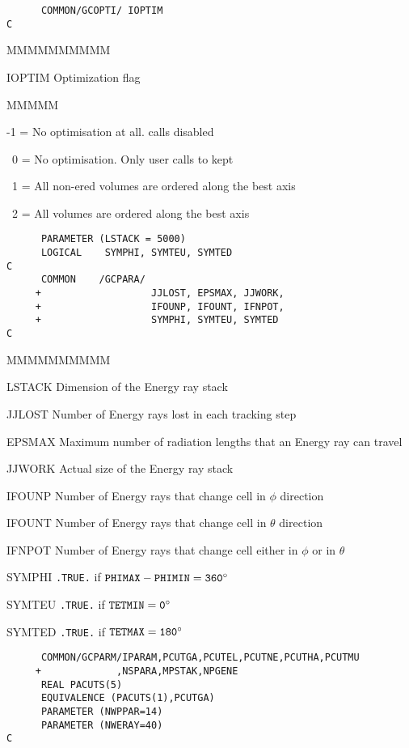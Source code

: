 \begin{verbatim}
      COMMON/GCOPTI/ IOPTIM
C
\end{verbatim}
\begin{DLtt}{MMMMMMMMMM}
\item[IOPTIM]Optimization flag
\begin{DLtt}{MMMMM}
\item[-1 =] No optimisation at all.  calls disabled
\item[~0 =] No optimisation. Only user calls to  kept
\item[~1 =] All non-ered volumes are ordered along the best axis
\item[~2 =] All volumes are ordered along the best axis
\end{DLtt}
\end{DLtt}
\begin{verbatim}
      PARAMETER (LSTACK = 5000)
      LOGICAL    SYMPHI, SYMTEU, SYMTED
C
      COMMON    /GCPARA/
     +                   JJLOST, EPSMAX, JJWORK,
     +                   IFOUNP, IFOUNT, IFNPOT,
     +                   SYMPHI, SYMTEU, SYMTED
C
\end{verbatim}
\begin{DLtt}{MMMMMMMMMM}
\item[LSTACK] Dimension of the Energy ray stack
\item[JJLOST] Number of Energy rays lost in each tracking step
\item[EPSMAX] Maximum number of radiation
lengths that an Energy ray can travel
\item[JJWORK] Actual size of the Energy ray stack
\item[IFOUNP] Number of Energy rays that change cell in $\phi$
direction
\item[IFOUNT] Number of Energy rays that change cell in $\theta$
direction
\item[IFNPOT] Number of Energy rays that change cell either in $\phi$
or in $\theta$
\item[SYMPHI] {\tt .TRUE.} if ${\tt PHIMAX-PHIMIN = 360^{\circ}}$
\item[SYMTEU] {\tt .TRUE.} if ${\tt TETMIN = 0^{\circ}}$
\item[SYMTED] {\tt .TRUE.} if ${\tt TETMAX = 180^{\circ}}$
\end{DLtt}
\begin{verbatim}
      COMMON/GCPARM/IPARAM,PCUTGA,PCUTEL,PCUTNE,PCUTHA,PCUTMU
     +             ,NSPARA,MPSTAK,NPGENE
      REAL PACUTS(5)
      EQUIVALENCE (PACUTS(1),PCUTGA)
      PARAMETER (NWPPAR=14)
      PARAMETER (NWERAY=40)
C
\end{verbatim}
